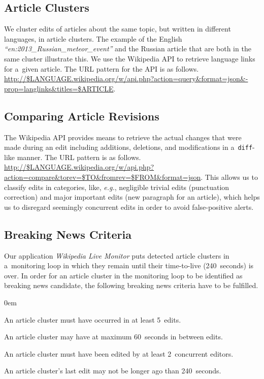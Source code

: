 \subsection{Article Clusters}

We cluster edits of articles about the same topic,
but written in different languages, in article clusters.
The example of the English
\emph{``en:2013\_Russian\_meteor\_event''}
and the Russian article
that are both in the same cluster illustrate this.
We use the Wikipedia API to retrieve language links for a~given article.
The URL pattern for the API is as follows.
\url{http://$LANGUAGE.wikipedia.org/w/api.php?action=query&format=json&-prop=langlinks&titles=$ARTICLE}.

\subsection{Comparing Article Revisions}
\label{sec:comparing-article-revisions}

The Wikipedia API provides means to retrieve the actual changes
that were made during an edit including additions, deletions,
and modifications in a~\texttt{diff}-like manner.
The URL pattern is as follows.
\url{http://$LANGUAGE.wikipedia.org/w/api.php?action=compare&torev=$TO&fromrev=$FROM&format=json}. %
This allows us to classify edits in categories, like, \emph{e.g.},
negligible trivial edits (punctuation correction) and 
major important edits (new paragraph for an article),
which helps us to disregard seemingly concurrent edits
in order to avoid false-positive alerts.

\subsection{Breaking News Criteria}

Our application \emph{Wikipedia Live Monitor} puts  
detected article clusters in a~monitoring loop in which they remain
until their time-to-live (240~seconds) is over.
In order for an article cluster in the monitoring loop
to be identified as breaking news candidate,
the following breaking news criteria have to be fulfilled.

\begin{description}
  \itemsep0em
  \item[$\geq$~5~Occurrences:] An article cluster must have occurred
  in at least 5~edits.
  \item[$\leq$~60~Seconds Between Edits:] An article cluster may have
  at maximum 60~seconds in between edits.
  \item[$\geq$~2~Concurrent Editors:] An article cluster must have been edited
  by at least 2~concurrent editors.
  \item[$\leq$~240~Seconds Since Last Edit:] An article cluster's last edit
  may not be longer ago than 240~seconds.
\end{description}

